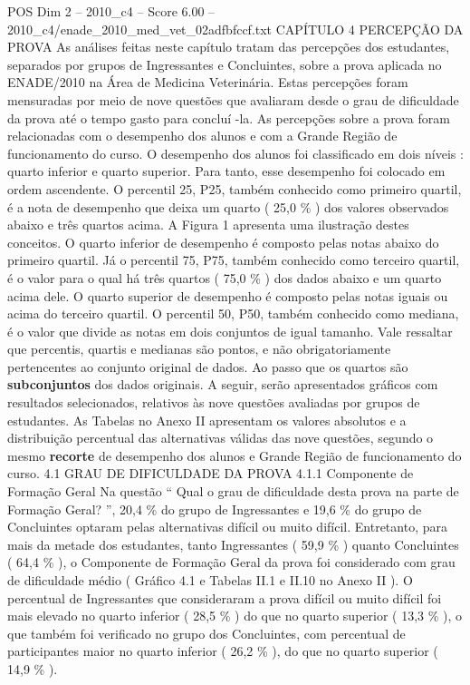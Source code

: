 \begin{textsample}{POS Dim 2 – 2010\_c4 – Score 6.00 – 2010\_c4/enade\_2010\_med\_vet\_02adfbfccf.txt}  \label{ex:f2_pos_150}
CAPÍTULO 4 PERCEPÇÃO DA PROVA As análises feitas neste capítulo tratam das percepções dos estudantes, separados por grupos de Ingressantes e Concluintes, sobre a prova aplicada no ENADE/2010 na Área de Medicina Veterinária.
Estas percepções foram mensuradas por meio de nove questões que avaliaram desde o grau de dificuldade da prova até o tempo gasto para concluí -la.
As percepções sobre a prova foram relacionadas com o desempenho dos alunos e com a Grande Região de funcionamento do curso.
O desempenho dos alunos foi classificado em dois níveis : quarto inferior e quarto superior.
Para tanto, esse desempenho foi colocado em ordem ascendente.
O percentil 25, P25, também conhecido como primeiro quartil, é a nota de desempenho que deixa um quarto ( 25,0 \% ) dos valores observados abaixo e três quartos acima.
A Figura 1 apresenta uma ilustração destes conceitos.
O quarto inferior de desempenho é composto pelas notas abaixo do primeiro quartil.
Já o percentil 75, P75, também conhecido como terceiro quartil, é o valor para o qual há três quartos ( 75,0 \% ) dos dados abaixo e um quarto acima dele.
O quarto superior de desempenho é composto pelas notas iguais ou acima do terceiro quartil.
O percentil 50, P50, também conhecido como mediana, é o valor que divide as notas em dois conjuntos de igual tamanho.
Vale ressaltar que percentis, quartis e medianas são pontos, e não obrigatoriamente pertencentes ao conjunto original de dados.
Ao passo que os quartos são \textbf{subconjuntos} dos dados originais.
A seguir, serão apresentados gráficos com resultados selecionados, relativos às nove questões avaliadas por grupos de estudantes.
As Tabelas no Anexo II apresentam os valores absolutos e a distribuição percentual das alternativas válidas das nove questões, segundo o mesmo \textbf{recorte} de desempenho dos alunos e Grande Região de funcionamento do curso. 4.1 GRAU DE DIFICULDADE DA PROVA 4.1.1 Componente de Formação Geral Na questão “ Qual o grau de dificuldade desta prova na parte de Formação Geral? ”, 20,4 \% do grupo de Ingressantes e 19,6 \% do grupo de Concluintes optaram pelas alternativas difícil ou muito difícil.
Entretanto, para mais da metade dos estudantes, tanto Ingressantes ( 59,9 \% ) quanto Concluintes ( 64,4 \% ), o Componente de Formação Geral da prova foi considerado com grau de dificuldade médio ( Gráfico 4.1 e Tabelas II.1 e II.10 no Anexo II ).
O percentual de Ingressantes que consideraram a prova difícil ou muito difícil foi mais elevado no quarto inferior ( 28,5 \% ) do que no quarto superior ( 13,3 \% ), o que também foi verificado no grupo dos Concluintes, com percentual de participantes maior no quarto inferior ( 26,2 \% ), do que no quarto superior ( 14,9 \% ).

\end{textsample}
